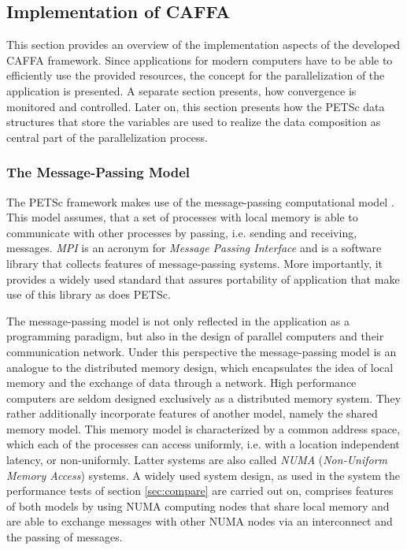 \subsection{Implementation of CAFFA}

This section provides an overview of the implementation aspects of the developed CAFFA framework. Since applications for modern computers have to be able to efficiently use the provided resources, the concept for the parallelization of the application is presented. A separate section presents, how convergence is monitored and controlled. Later on, this section presents how the PETSc data structures that store the variables are used to realize the data composition as central part of the parallelization process.

\subsubsection{The Message-Passing Model}

The PETSc framework makes use of the message-passing computational model \cite{gropp99}. This model assumes, that a set of processes with local memory is able to communicate with other processes by passing, i.e. sending and receiving, messages. \emph{MPI} is an acronym for \emph{Message Passing Interface} and is a software library that collects features of message-passing systems. More importantly, it provides a widely used standard that assures portability of application that make use of this library as does PETSc. 

The message-passing model is not only reflected in the application as a programming paradigm, but also in the design of parallel computers and their communication network. Under this perspective the message-passing model is an analogue to the distributed memory design, which encapsulates the idea of local memory and the exchange of data through a network. High performance computers are seldom designed exclusively as a distributed memory system. They rather additionally incorporate features of another model, namely the shared memory model. This memory model is characterized by a common address space, which each of the processes can access uniformly, i.e. with a location independent latency, or non-uniformly. Latter systems are also called \emph{NUMA} (\emph{Non-Uniform Memory Access}) systems. A widely used system design, as used in the system the performance tests of section \ref{sec:compare} are carried out on, comprises features of both models by using NUMA computing nodes that share local memory and are able to exchange messages with other NUMA nodes via an interconnect and the passing of messages.

